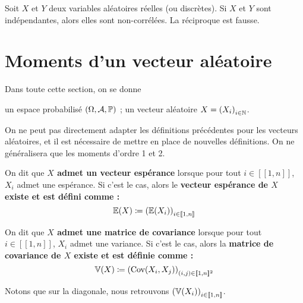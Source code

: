 \documentclass[../integ-proba.tex]{subfiles}
\begin{document}
    \begin{prop}
        Soit $X$ et $Y$ deux variables aléatoires réelles (ou discrètes).
        Si $X$ et $Y$ sont indépendantes, alors elles sont non-corrélées.
        La réciproque est fausse.
    \end{prop}

    \section{Moments d'un vecteur aléatoire}

    Dans toute cette section, on se donne
    \begin{itemize}
        \itemb un espace probabilisé $\left(\Omega, \mathcal{A}, \mathbb{P}\right)$ ;
        \itemb un vecteur aléatoire $X = \left( X_i \right)_{i \in \mathbb{N}}$.
    \end{itemize}

    On ne peut pas directement adapter les définitions précédentes pour les vecteurs aléatoires, et il est nécessaire de mettre en place de nouvelles définitions.
    On ne généralisera que les moments d'ordre 1 et 2.

    \begin{defi}
        \label{def:vecteur_esperance}
        On dit que \textbf{$X$ admet un vecteur espérance} lorsque pour tout $i \in [\![1,n]\!]$, $X_i$ admet une espérance.
        Si c'est le cas, alors le \textbf{vecteur espérance de $X$ existe et est défini comme :}
       \begin{displaymath}
           \mathbb{E}(X) \coloneqq \left( \mathbb{E}(X_i) \right)_{i \in [\![1,n]\!]}
       \end{displaymath}
    \end{defi}

    \begin{defi}
        On dit que \textbf{$X$ admet une matrice de covariance} lorsque pour tout $i \in [\![1, n]\!]$, $X_i$ admet une variance.
        Si c'est le cas, alors la \textbf{matrice de covariance de $X$ existe et est définie comme :}
        \begin{displaymath}
            \mathbb{V}(X) \coloneqq \left( \text{Cov}(X_i, X_j) \right)_{\left( i,j \right) \in [\![1, n]\!]^2}
        \end{displaymath}
    \end{defi}

    \begin{rem}
        Notons que sur la diagonale, nous retrouvons $\left( \mathbb{V} (X_i) \right)_{i \in [\![1,n]\!]}$.
    \end{rem}
\end{document}
